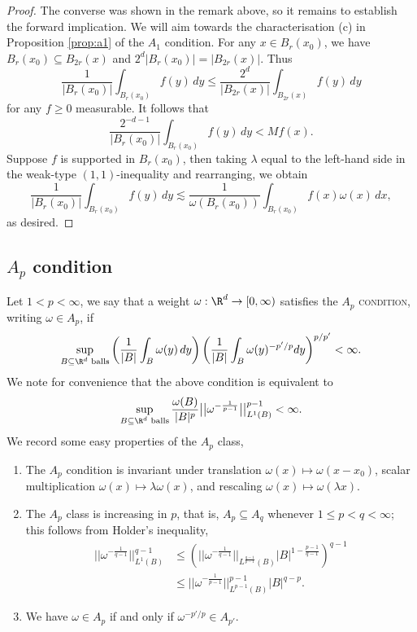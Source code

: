 \documentclass[reqno]{amsart}
\theoremstyle{definition}
\theoremstyle{remark}
\renewcommand{\emph}{\textsc}
\begin{document}
\begin{proof}
	The converse was shown in the remark above, so it remains to establish the forward implication. We will aim towards the characterisation (c) in Proposition \ref{prop:a1} of the $A_1$ condition. For any $x \in B_r (x_0)$, we have $B_r (x_0) \subseteq B_{2r} (x)$ and $2^d |B_r (x_0)| = |B_{2r} (x)|$. Thus 
		\[ \frac{1}{|B_r (x_0)|} \int_{B_r (x_0)} f(y) \, dy \leq \frac{2^d}{|B_{2r} (x)|} \int_{B_{2r} (x)} f(y) \, dy \]
	for any $f \geq 0$ measurable. It follows that
		\[ \frac{2^{-d - 1}}{|B_r (x_0)|} \int_{B_r (x_0)} f(y) \, dy < M f(x). \]
	Suppose $f$ is supported in $B_r (x_0)$, then taking $\lambda$ equal to the left-hand side in the weak-type $(1, 1)$-inequality and rearranging, we obtain
		\[ \frac{1}{|B_r (x_0)|} \int_{B_r (x_0)} f(y) \, dy \lesssim \frac{1}{\omega(B_r (x_0))} \int_{B_r (x_0)} f(x) \omega(x) \, dx, \]	
	as desired. 	
\end{proof}	

\subsection{$A_p$ condition}

Let $1 < p < \infty$, we say that a weight $\omega : \R^d \to [0, \infty)$ satisfies the \emph{$A_p$ condition}, writing $\omega \in A_p$, if 
	\[ \sup_{B \subseteq \R^d \text{ balls}}\left(\frac{1}{|B|} \int_B \omega(y) \, dy\right) \left( \frac{1}{|B|} \int_B \omega(y)^{-p'/p} dy \right)^{p/p'} < \infty. \]
We note for convenience that the above condition is equivalent to 
	\[ \sup_{B \subseteq \R^d \text{ balls}} \frac{\omega(B)}{|B|^p}\big|\big|  \omega^{-\frac{1}{p - 1}} \big|\big|_{L^1 (B)}^{p - 1} < \infty. \]
We record some easy properties of the $A_p$ class, 
\begin{enumerate}
	\item The $A_p$ condition is invariant under translation $\omega (x) \mapsto \omega(x - x_0)$, scalar multiplication $\omega (x) \mapsto \lambda \omega (x)$, and rescaling $\omega(x) \mapsto \omega(\lambda x)$.
	 
	\item The $A_p$ class is increasing in $p$, that is, $A_p \subseteq A_q$ whenever $1 \leq p < q < \infty$; this follows from Holder's inequality,
				\begin{align*}
					 \big|\big|  \omega^{-\frac{1}{q - 1}} \big|\big|_{L^1 (B)}^{q - 1}
					 		&\leq \left(\big|\big|  \omega^{-\frac{1}{q - 1}} \big|\big|_{L^{\frac{q - 1}{p - 1}} (B)} |B|^{1 - \frac{p - 1}{q - 1}} \right)^{q - 1} \\
					 		&\leq \big|\big|  \omega^{-\frac{1}{p - 1}} \big|\big|_{L^{p - 1} (B)}^{p - 1} |B|^{q - p}.
				\end{align*}	 
	
	\item We have $\omega \in A_p$ if and only if $\omega^{-p'/p} \in A_{p'}$. 
\end{enumerate}
\end{document}
